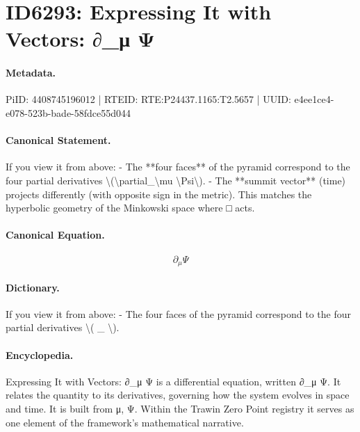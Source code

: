\section*{ID6293: Expressing It with Vectors: ∂\_μ Ψ}
\paragraph{Metadata.}
PiID: 4408745196012 | RTEID: RTE:P24437.1165:T2.5657 | UUID: e4ee1ce4-e078-523b-bade-58fdce55d044

\paragraph{Canonical Statement.}
If you view it from above: - The **four faces** of the pyramid correspond to the four partial derivatives \textbackslash{}(\textbackslash{}partial\_\textbackslash{}mu \textbackslash{}Psi\textbackslash{}). - The **summit vector** (time) projects differently (with opposite sign in the metric). This matches the hyperbolic geometry of the Minkowski space where □ acts.

\paragraph{Canonical Equation.}
\[
\partial_\mu \Psi
\]

\paragraph{Dictionary.}
If you view it from above: - The four faces of the pyramid correspond to the four partial derivatives \textbackslash{}( \_ \textbackslash{}).

\paragraph{Encyclopedia.}
Expressing It with Vectors: ∂\_μ Ψ is a differential equation, written ∂\_μ Ψ. It relates the quantity to its derivatives, governing how the system evolves in space and time. It is built from μ, Ψ. Within the Trawin Zero Point registry it serves as one element of the framework's mathematical narrative.
